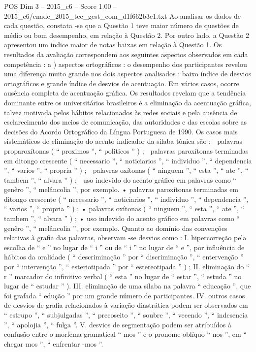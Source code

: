 \begin{textsample}{POS Dim 3 – 2015\_c6 – Score 1.00 – 2015\_c6/enade\_2015\_tec\_gest\_com\_d1f662b3e1.txt}
Ao analisar os dados de cada questão, constata -se que a Questão 1 teve maior número de questões de médio ou bom desempenho, em relação à Questão 2.
Por outro lado, a Questão 2 apresentou um índice maior de notas baixas em relação à Questão 1.
Os resultados da avaliação correspondem aos seguintes aspectos observados em cada competência : a ) aspectos ortográficos : o desempenho dos participantes revelou uma diferença muito grande nos dois aspectos analisados : baixo índice de desvios ortográficos e grande índice de desvios de acentuação.
Em vários casos, ocorre ausência completa de acentuação gráfica.
Os resultados revelam que a tendência dominante entre os universitários brasileiros é a eliminação da acentuação gráfica, talvez motivada pelos hábitos relacionados às redes sociais e pela ausência de esclarecimento dos meios de comunicação, das autoridades e das escolas sobre as decisões do Acordo Ortográfico da Língua Portuguesa de 1990.
Os casos mais sistemáticos de eliminação do acento indicador da sílaba tônica são :  palavras proparoxítonas ( “ proximos ”, “ politicos ” ) ;  palavras paroxítonas terminadas em ditongo crescente ( “ necessario ”, “ noticiarios ”, “ individuo ”, “ dependencia ”, “ varios ”, “ propria ” ) ;  palavras oxítonas ( “ ninguem ”, “ esta ”, “ ate ”, “ tambem ”, “ alvara ” ) ;  uso indevido do acento gráfico em palavras como “ genêro ”, “ melâncolia ”, por exemplo. • palavras paroxítonas terminadas em ditongo crescente ( “ necessario ”, “ noticiarios ”, “ individuo ”, “ dependencia ”, “ varios ”, “ propria ” ) ; • palavras oxítonas ( “ ninguem ”, “ esta ”, “ ate ”, “ tambem ”, “ alvara ” ) ; • uso indevido do acento gráfico em palavras como “ genêro ”, “ melâncolia ”, por exemplo.
Quanto ao domínio das convenções relativas à grafia das palavras, observam -se desvios como : I. hipercorreção pela escolha de “ e ” no lugar de “ i ” ou de “ i ” no lugar de “ e ”, por influência de hábitos da oralidade ( “ descriminação ” por “ discriminação ”, “ entervenção ” por “ intervenção ”, “ esteriotipada ” por “ estereotipada ” ) ; II. eliminação do “ r ” marcador do infinitivo verbal ( “ esta ” no lugar de “ estar ”, “ estuda ” no lugar de “ estudar ” ).
III. eliminação de uma sílaba na palavra “ educação ”, que foi grafada “ edução ” por um grande número de participantes.
IV. outros casos de desvios de grafia relacionados à variação diastrática podem ser observados em “ estrupo ”, “ subjulgadas ”, “ precoseito ”, “ soubre ”, “ vecendo ”, “ indesencia ”, “ apolojia ”, “ fulga ”.
V. desvios de segmentação podem ser atribuídos à confusão entre o morfema gramatical “ mos ” e o pronome oblíquo “ nos ”, em “ chegar mos ”, “ enfrentar -mos ”.

\end{textsample}
